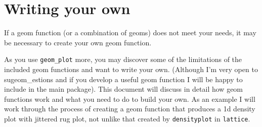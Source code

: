 

\section{Writing your own}\label{sec:writing_your_own}

If a geom function (or a combination of geoms) does not meet your needs, it may be necessary to create your own geom function.  

As you use \texttt{geom_plot} more, you may discover some of the limitations of the included geom functions and want to write your own.  (Although I'm very open to sugeom_estions and if you develop a useful geom function I will be happy to include in the main package).  This document will discuss in detail how geom functions work and what you need to do to build your own.  As an example I will work through the process of creating a geom function that produces a 1d density plot with jittered rug plot, not unlike that created by \texttt{densityplot} in \texttt{lattice}.

